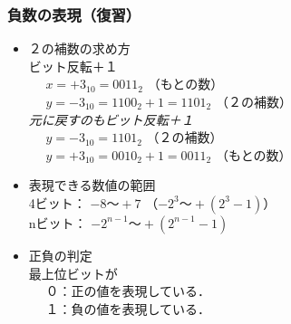 \documentclass[handout]{beamer}        %
\begin{document}
\begin{frame}
  \frametitle{負数の表現（復習）}
  \begin{itemize}
  \item ２の補数の求め方 \\
    ビット反転＋１\\
    ~~ $x = +3_{10} = 0011_2$ （もとの数）\\
    ~~ $y = -3_{10} = 1100_2 + 1 = 1101_2$ （２の補数）\\
    \emph{元に戻すのもビット反転＋１}\\
    ~~ $y = -3_{10} = 1101_2$ （２の補数）\\
    ~~ $y = +3_{10} = 0010_2 + 1 = 0011_2$ （もとの数）\\
    \vfill
  \item 表現できる数値の範囲 \\
    4ビット： $-8 〜 +7$ （$-2^3〜+(2^3-1)$） \\
    nビット： $-2^{n-1} 〜 +(2^{n-1} - 1)$
    \vfill
  \item 正負の判定 \\
    最上位ビットが \\
    ~~ ０：正の値を表現している．\\
    ~~ １：負の値を表現している．
  \end{itemize}
\end{frame}
\end{document}
